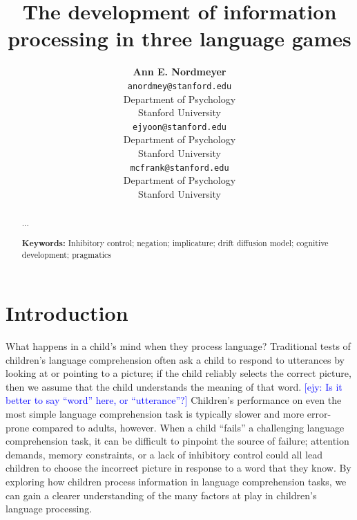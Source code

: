 \documentclass[10pt,letterpaper]{article}
\title{The development of information processing in three language games}
\author{{\large \bf Ann E. Nordmeyer} \\
  \texttt{anordmey@stanford.edu} \\
  Department of Psychology \\
  Stanford University
  \And {\large \bf Erica J. Yoon} \\
  \texttt{ejyoon@stanford.edu} \\
  Department of Psychology \\
  Stanford University
  \And {\large \bf Michael C. Frank} \\
  \texttt{mcfrank@stanford.edu} \\
  Department of Psychology \\
  Stanford University}
\newcommand{\ejy}[1]{\textcolor{Blue}{[ejy: #1]}}
\begin{document}
\maketitle


\begin{abstract}

...

\textbf{Keywords:} 
Inhibitory control; negation; implicature; drift diffusion model; cognitive development; pragmatics

\end{abstract}


\section{Introduction}

What happens in a child's mind when they process language? Traditional tests of children's language comprehension often ask a child to respond to utterances by looking at or pointing to a picture; if the child reliably selects the correct picture, then we assume that the child understands the meaning of that word. \ejy{Is it better to say ``word'' here, or ``utterance''?} Children's performance on even the most simple language comprehension task is typically slower and more error-prone compared to adults, however.  When a child ``fails'' a challenging language comprehension task, it can be difficult to pinpoint the source of failure; attention demands, memory constraints, or a lack of inhibitory control could all lead children to choose the incorrect picture in response to a word that they know.  By exploring how children process information in language comprehension tasks, we can gain a clearer understanding of the many factors at play in children's language processing. 
\end{document}
